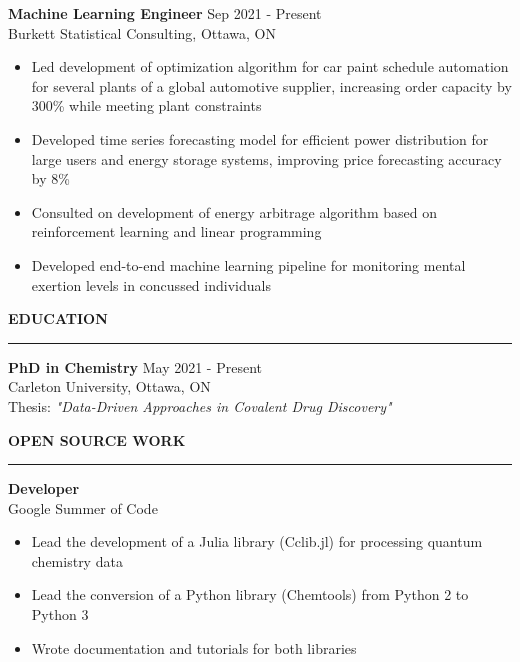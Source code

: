 \documentclass[11pt]{article}
\begin{document}
\textbf{Machine Learning Engineer} \hfill {\color{accentgray} Sep 2021 - Present}\\
{\color{accentgray} Burkett Statistical Consulting, Ottawa, ON}\\[4pt]
\begin{itemize}[itemsep=0.1pt, topsep=0pt]
    \item Led development of optimization algorithm for car paint schedule automation for several plants of a global automotive supplier, increasing order capacity by 300\% while meeting plant constraints
    \item Developed time series forecasting model for efficient power distribution for large users and energy storage systems, improving price forecasting accuracy by 8\%
    \item Consulted on development of energy arbitrage algorithm based on reinforcement learning and linear programming
    \item Developed end-to-end machine learning pipeline for monitoring mental exertion levels in concussed individuals
\end{itemize}

\vspace*{0.1in}

{\color{headinggray}\textbf{\large EDUCATION}}\\[-10pt]
\noindent\textcolor{accentblue}{\rule{\textwidth}{1.5pt}}
\vspace*{-0.15in}

\textbf{PhD in Chemistry} \hfill {\color{accentgray} May 2021 - Present}\\
{\color{accentgray} Carleton University, Ottawa, ON}\\[4pt]
Thesis: \textit{"Data-Driven Approaches in Covalent Drug Discovery"}

\vspace*{0.1in}

{\color{headinggray}\textbf{\large OPEN SOURCE WORK}}\\[-10pt]
\noindent\textcolor{accentblue}{\rule{\textwidth}{1.5pt}}
\vspace*{-0.15in}

\textbf{Developer}\\
{\color{accentgray} Google Summer of Code}\\[4pt]
\begin{itemize}[itemsep=0.1pt, topsep=0pt]
    \item Lead the development of a Julia library (Cclib.jl) for processing quantum chemistry data
    \item Lead the conversion of a Python library (Chemtools) from Python 2 to Python 3
    \item Wrote documentation and tutorials for both libraries
\end{itemize}
\end{document}
